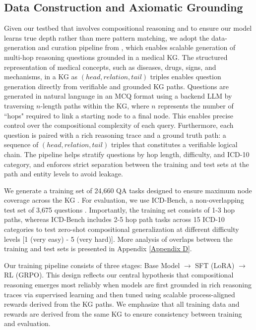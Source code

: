 \documentclass{article}
\theoremstyle{plain}
\theoremstyle{definition}
\theoremstyle{remark}
\begin{document}
\subsection{Data Construction and Axiomatic Grounding}
\label{Data_Construction}
Given our testbed that involves compositional reasoning and to ensure our model learns true depth rather than mere pattern matching, we adopt the data-generation and curation pipeline from \cite{Dedhia2025Bottom-upNeed}, which enables scalable generation of multi-hop reasoning questions grounded in a medical KG. The structured representation of medical concepts, such as diseases, drugs, signs, and mechanisms, in a KG as $(head, relation, tail)$ triples enables question generation directly from verifiable and grounded KG paths. Questions are generated in natural language in an MCQ format using a backend LLM by traversing $n$-length paths within the KG, where $n$ represents the number of ``hops" required to link a starting node to a final node. This enables precise control over the compositional complexity of each query. Furthermore, each question is paired with a rich reasoning trace and a ground truth path: a sequence of $(head, relation, tail)$ triples that constitutes a verifiable logical chain. The pipeline helps stratify questions by hop length, difficulty, and ICD-10 category, and enforces strict separation between the training and test sets at the path and entity levels to avoid leakage. 

We generate a training set of 24,660 QA tasks designed to ensure maximum node coverage across the KG \citep{yasunaga2021qa}. For evaluation, we use ICD-Bench, a non-overlapping test set of 3,675 questions \citep{Dedhia2025Bottom-upNeed}. Importantly, the training set consists of 1-3 hop paths, whereas ICD-Bench includes 2-5 hop path tasks across 15 ICD-10 categories to test zero-shot compositional generalization at different difficulty levels [1 (very easy) - 5 (very hard)]. More analysis of overlaps between the training and test sets is presented in Appendix \ref{Appendix D}.

Our training pipeline consists of three stages: Base Model $\rightarrow$ SFT (LoRA) $\rightarrow$ RL (GRPO). This design reflects our central hypothesis that compositional reasoning emerges most reliably when models are first grounded in rich reasoning traces via supervised learning and then tuned using scalable process-aligned rewards derived from the KG paths. We emphasize that all training data and rewards are derived from the same KG to ensure consistency between training and evaluation. 
\end{document}
